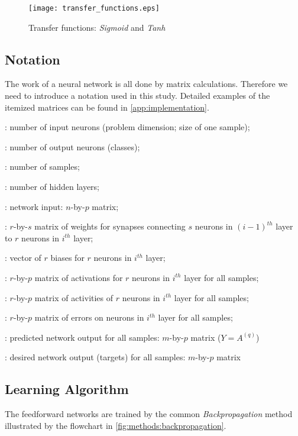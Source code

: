 \begin{figure}[H]
  \centering
  \texttt{[image: transfer\_functions.eps]}
  \caption{Transfer functions: \textit{Sigmoid} and \textit{Tanh}}
  \label{fig:methods:transfer_functions}
\end{figure}

\subsection*{Notation}
The work of a neural network is all done by matrix calculations. Therefore we need to introduce a notation used in this study. Detailed examples of the itemized matrices can be found in \cref{app:implementation}.

\begin{description}[leftmargin=!,labelwidth=\widthof{\bfseries $ W^{(i)} $}]
\item[$ n $] : number of input neurons (problem dimension; size of one sample);
\item[$ m $] : number of output neurons (classes);
\item[$ p $] : number of samples;
\item[$ q $] : number of hidden layers;
\item[$ X $] : network input: $ n $-by-$ p $ matrix;
\item[$ W^{(i)} $] : $ r $-by-$ s $ matrix of weights for synapses connecting $ s $ neurons in $ (i-1)^{th} $ layer to $ r $ neurons in $ i^{th} $ layer;
\item[$ B^{(i)} $] : vector of $ r $ biases for $ r $ neurons in $ i^{th} $ layer;
\item[$ Z^{(i)} $] : $ r $-by-$ p $ matrix of activations for $ r $ neurons in $ i^{th} $ layer for all samples;
\item[$ A^{(i)} $] : $ r $-by-$ p $ matrix of activities of $ r $ neurons in $ i^{th} $ layer for all samples;
\item[$ \Delta^{(i)} $] : $ r $-by-$ p $ matrix of errors on neurons in $ i^{th} $ layer for all samples;
\item[$ Y $] : predicted network output for all samples: $ m $-by-$ p $ matrix ($ Y = A^{(q)} $)
\item[$ U $] : desired network output (targets) for all samples: $ m $-by-$ p $ matrix
\end{description}

\subsection*{Learning Algorithm}
The feedforward networks are trained by the common \textit{Backpropagation} method illustrated by the flowchart in \cref{fig:methods:backpropagation}.


